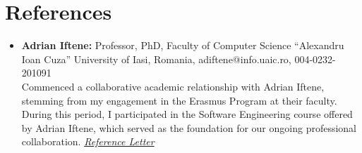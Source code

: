 \documentclass[letterpaper,11pt]{article}
\begin{document}

  \section{References}
    \begin{itemize}
      \item \textbf{Adrian Iftene:} Professor, PhD, Faculty of Computer Science “Alexandru Ioan Cuza” University of Iasi, Romania, adiftene@info.uaic.ro, 004-0232-201091
            \vspace{3pt}\\
            Commenced a collaborative academic relationship with Adrian Iftene, stemming from my engagement in the Erasmus Program at their faculty. During this period, I participated in the Software Engineering course offered by Adrian Iftene, which served as the foundation for our ongoing professional collaboration.
            \emph{\href{https://drive.google.com/file/d/1X6BuxZkUioau63j5d_8L4Fg9YoepFxnk/view?usp=sharing}{\color{blue}Reference Letter}}
    \end{itemize}
\end{document}
